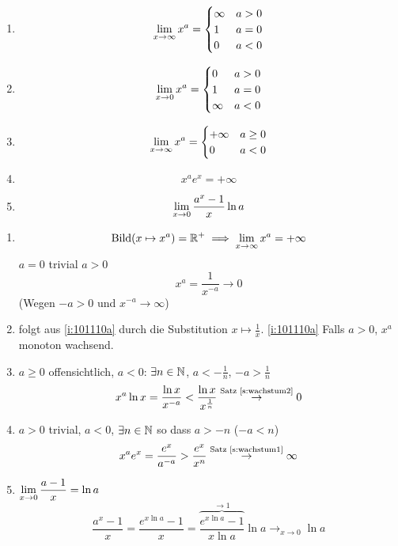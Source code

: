 \begin{Sat}
  \begin{enumerate}
    \item \[\displaystyle\lim_{x\rightarrow\infty}x^a= \begin{cases}
      \infty&a>0\\
      1&a=0\\
      0&a<0\\
    \end{cases}\] \label{i:101110a}
    \item \[\displaystyle\lim_{x\rightarrow0}x^a= \begin{cases}
      0&a>0\\
      1&a=0\\
      \infty&a<0\\
    \end{cases}\]  \label{i:101110b}
    \item \[\displaystyle\lim_{x\rightarrow\infty}x^a= \begin{cases}
      +\infty&a\geq0\\
      0&a<0\\
    \end{cases}\] \label{i:101110c}
    \item \[x^ae^x=+\infty\] \label{i:101110d}
    \item \[\displaystyle\lim_{x\rightarrow0}\frac{a^x-1}{x}\ln a\] \label{i:101110e}
  \end{enumerate}
\end{Sat}
\begin{Bew}
  \begin{enumerate}
    \item 
      \[\text{Bild}(x\mapsto x^a)=\mathbb{R}^+\implies\displaystyle\lim_{x\rightarrow\infty}x^a=+\infty\]
      $a=0$ trivial
      $a>0$
      \[x^a=\frac{1}{x^{-a}}\to0\]
      (Wegen $-a>0$ und $x^{-a}\to\infty$)
    \item folgt aus \ref{i:101110a} durch die Substitution $x\mapsto \frac{1}{x}$. \ref{i:101110a} Falls $a>0$, $x^a$ monoton wachsend.
    \item $a\geq 0$ offensichtlich, $a<0$: $\exists n\in\mathbb{N}$, $a<-\frac{1}{n}$, $-a>\frac{1}{n}$
      \[x^a\ln x=\frac{\ln x}{x^{-a}}<\frac{\ln x}{x^{\frac{1}{n}}}\stackrel{\text{Satz \ref{s:wachstum2}}}{\to} 0\]
    \item $a>0$ trivial, $a<0$, $\exists n\in\mathbb{N}$ so dass $a>-n$ ($-a<n$)
      \[x^ae^x=\frac{e^x}{a^{-a}}>\frac{e^x}{x^n}\stackrel{\text{Satz \ref{s:wachstum1}}}{\to}\infty\]
    \item $\displaystyle\lim_{x\rightarrow0}\frac{a-1}{x}=\ln a$
      \[\frac{a^x-1}{x}=\frac{e^{x\ln a}-1}{x}=\overbrace{\frac{e^{x\ln a}-1}{x\ln a}}^{\to 1}\ln a\to_{x\to 0} \ln a\]
  \end{enumerate}
\end{Bew}
